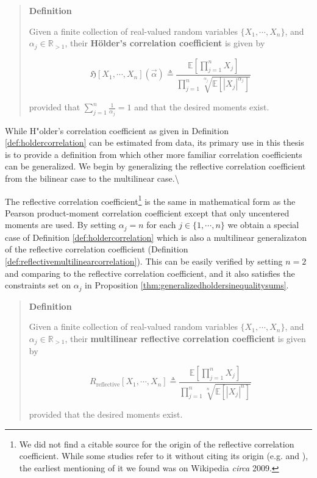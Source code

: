 \documentclass[
  letterpaper,
  DIV=11,
  numbers=noendperiod]{scrreprt}
\begin{document}
\begin{quote}
\textbf{Definition}

Given a finite collection of real-valued random variables
\(\{X_1, \cdots, X_n\}\), and \(\alpha_j \in \mathbb{R}_{>1}\), their
\textbf{Hölder's correlation coefficient} is given by

\[\mathfrak{H} \left[ X_1, \cdots, X_n \right](\vec \alpha) \triangleq \frac{\mathbb{E} \left[ \prod_{j=1}^{n} X_j \right]}{\prod_{j=1}^{n} \sqrt[\alpha_j]{\mathbb{E} \left[ |X_j|^{\alpha_j} \right]}}\]

provided that \(\sum_{j=1}^{n} \frac{1}{\alpha_j} = 1\) and that the
desired moments exist.
\end{quote}

While H"older's correlation coefficient as given in Definition
\ref{def:holdercorrelation} can be estimated from data, its primary use
in this thesis is to provide a definition from which other more familiar
correlation coefficients can be generalized. We begin by generalizing
the reflective correlation coefficient from the bilinear case to the
multilinear case.\textbackslash{}

The reflective correlation
coefficient\footnote{We did not find a citable source for the origin of the reflective correlation coefficient. While some studies refer to it without citing its origin (e.g. \cite{Zhu2014} and \cite{Tllse2021}), the earliest mentioning of it we found was on Wikipedia \textit{circa} 2009.}
is the same in mathematical form as the Pearson product-moment
correlation coefficient except that only uncentered moments are used. By
setting \(\alpha_j = n\) for each \(j \in \{1, \cdots, n \}\) we obtain
a special case of Definition \ref{def:holdercorrelation} which is also a
multilinear generalizaton of the reflective correlation coefficient
(Definition \ref{def:reflectivemultilinearcorrelation}). This can be
easily verified by setting \(n=2\) and comparing to the reflective
correlation coefficient, and it also satisfies the constraints set on
\(\alpha_j\) in Proposition \ref{thm:generalizedholdersinequalitysums}.

\begin{quote}
\textbf{Definition}

Given a finite collection of real-valued random variables
\(\{X_1, \cdots, X_n\}\), and \(\alpha_j \in \mathbb{R}_{>1}\), their
\textbf{multilinear reflective correlation coefficient} is given by

\[R_{\text{reflective}} \left[ X_1, \cdots, X_n \right] \triangleq \frac{\mathbb{E} \left[ \prod_{j=1}^{n} X_j \right]}{\prod_{j=1}^{n} \sqrt[n]{\mathbb{E} \left[ |X_j|^{n} \right]}}\]

provided that the desired moments exist.
\end{quote}
\end{document}
